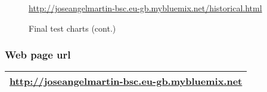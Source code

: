 \begin{figure}[htb]\ContinuedFloat
	\centering
	\caption{Final test charts (cont.)}
	\label{fig:6-RealTime}{\url{http://joseangelmartin-bsc.eu-gb.mybluemix.net/historical.html}}
\end{figure}

\subsubsection{Web page url}

\begin{tabular}{|>{\columncolor[HTML]{C0C0C0}}l |}
	\hline
	\url{http://joseangelmartin-bsc.eu-gb.mybluemix.net}\\
	\hline
\end{tabular}
